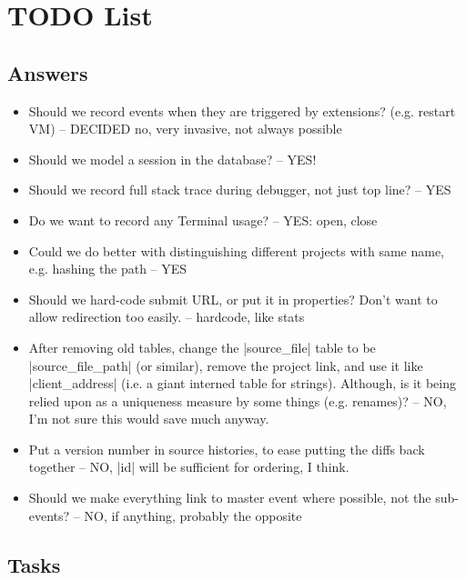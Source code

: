 \documentclass{book}
\begin{document}
\chapter{TODO List}

\section{Answers}

\begin{itemize}
\item Should we record events when they are triggered by extensions?
  (e.g. restart VM) -- DECIDED no, very invasive, not always possible
\item Should we model a session in the database? -- YES!
\item Should we record full stack trace during debugger, not just top line? -- YES
\item Do we want to record any Terminal usage? -- YES: open, close
\item Could we do better with distinguishing different projects with same
  name, e.g. hashing the path -- YES
\item Should we hard-code submit URL, or put it in properties?  Don't want to
  allow redirection too easily. -- hardcode, like stats
\item After removing old tables, change the |source_file| table to be
  |source_file_path| (or similar), remove the project link, and use it like
  |client_address| (i.e. a giant interned table for strings).  Although, is it
  being relied upon as a uniqueness measure by some things (e.g. renames)? --
  NO, I'm not sure this would save much anyway.
\item Put a version number in source histories, to ease putting the diffs back
  together -- NO, |id| will be sufficient for ordering, I think.  
\item Should we make everything link to master event where possible, not the
  sub-events? -- NO, if anything, probably the opposite
\end{itemize}

\section{Tasks}
\end{document}
